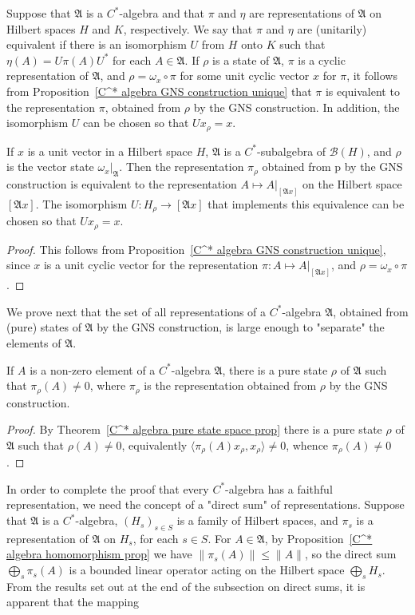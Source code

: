 Suppose that $\mathfrak{A}$ is a $C^*$-algebra and that $\pi$ and $\eta$ are representations of $\mathfrak{A}$ on Hilbert spaces $H$ and $K$, respectively. We say that $\pi$ and $\eta$ are (unitarily) equivalent if there is an isomorphism $U$ from $H$ onto $K$ such that $\eta(A)=U\pi(A)U^*$ for each $A\in\mathfrak{A}$. If $\rho$ is a state of $\mathfrak{A}$, $\pi$ is a cyclic representation of $\mathfrak{A}$, and $\rho=\omega_x\circ\pi$ for some unit cyclic vector $x$ for $\pi$, it follows from Proposition~\ref{C^* algebra GNS construction unique} that $\pi$ is equivalent to the representation $\pi$, obtained from $\rho$ by the GNS construction. In addition, the isomorphism $U$ can be chosen so that $Ux_\rho=x$.
\begin{corollary}
If $x$ is a unit vector in a Hilbert space $H$, $\mathfrak{A}$ is a $C^*$-subalgebra of $\mathcal{B}(H)$, and $\rho$ is the vector state $\omega_x|_{\mathfrak{A}}$. Then the representation $\pi_\rho$ obtained from p by the GNS construction is equivalent to the representation $A\mapsto A|_{[\mathfrak{A}x]}$ on the Hilbert space $[\mathfrak{A}x]$. The isomorphism $U:H_\rho\to[\mathfrak{A}x]$ that implements this equivalence can be chosen so that $Ux_\rho=x$.
\end{corollary}
\begin{proof}
This follows from Proposition~\ref{C^* algebra GNS construction unique}, since $x$ is a unit cyclic vector for the representation $\pi:A\mapsto A|_{[\mathfrak{A}x]}$, and $\rho=\omega_x\circ\pi$.
\end{proof}
We prove next that the set of all representations of a $C^*$-algebra $\mathfrak{A}$, obtained from (pure) states of $\mathfrak{A}$ by the GNS construction, is large enough to "separate" the elements of $\mathfrak{A}$.
\begin{proposition}\label{C^* algebra nonzero representation on element}
If $A$ is a non-zero element of a $C^*$-algebra $\mathfrak{A}$, there is a pure state $\rho$ of $\mathfrak{A}$ such that $\pi_\rho(A)\neq 0$, where $\pi_\rho$ is the representation obtained from $\rho$ by the GNS construction.
\end{proposition}
\begin{proof}
By Theorem~\ref{C^* algebra pure state space prop} there is a pure state $\rho$ of $\mathfrak{A}$ such that $\rho(A)\neq 0$, equivalently $\langle\pi_\rho(A)x_\rho,x_\rho\rangle\neq 0$, whence $\pi_\rho(A)\neq 0$.
\end{proof}
In order to complete the proof that every $C^*$-algebra has a faithful representation, we need the concept of a "direct sum" of representations. Suppose that $\mathfrak{A}$ is a $C^*$-algebra, $(H_{s})_{s\in S}$ is a family of Hilbert spaces, and $\pi_s$ is a representation of $\mathfrak{A}$ on $H_s$, for each $s\in S$. For $A\in\mathfrak{A}$, by Proposition~\ref{C^* algebra homomorphism prop} we have $\|\pi_s(A)\|\leq\|A\|$, so the direct sum $\bigoplus_s\pi_s(A)$ is a bounded linear operator acting on the Hilbert space $\bigoplus_sH_s$. From the results set out at the end of the subsection on direct sums, it is apparent that the mapping
